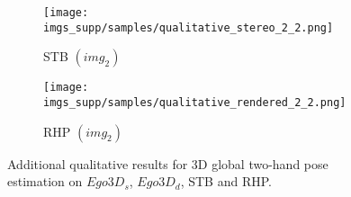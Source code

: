 \documentclass[10pt,twocolumn,letterpaper]{article}
\begin{document}
\begin{figure*}[h]
  \begin{subfigure}[t]{0.21962264\linewidth}
    \texttt{[image: imgs\_supp/samples/qualitative\_stereo\_2\_2.png]}
    \caption{STB $(img_{2})$}\label{fig:qualitative_stb}
  \end{subfigure}
  \begin{subfigure}[t]{0.16471698\linewidth}
    \texttt{[image: imgs\_supp/samples/qualitative\_rendered\_2\_2.png]}
    \caption{RHP $(img_{2})$}\label{fig:qualitative_rhp}
  \end{subfigure}
  \vspace{0.4cm}
  \caption{Additional qualitative results for 3D global two-hand pose estimation on $Ego3D_{s}$, $Ego3D_{d}$, STB and RHP. }
  \label{fig:qualitative_results2}
\end{figure*}
\end{document}

